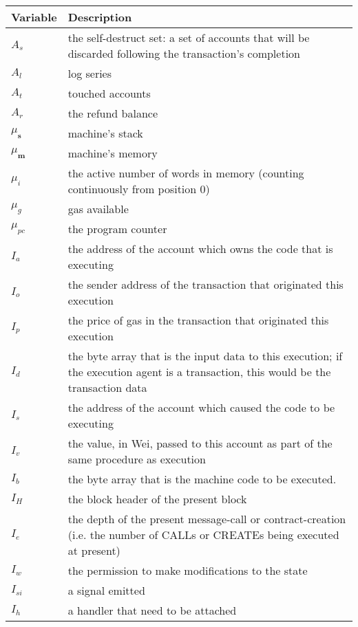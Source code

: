 \documentclass{article}
\begin{document}
\begin{tabular}{l|p{10cm}}
\textbf{Variable} & \textbf{Description} \\
\hline
\hline
$A_s$ & the self-destruct set: a set of accounts that will be discarded following the transaction’s completion \\
$A_l$ & log series \\
$A_t$ & touched accounts \\
$A_r$ & the refund balance \\
$\mu_\mathbf{s}$ & machine’s stack \\
$\mu_\mathbf{m}$ & machine’s memory \\
$\mu_i$ & the active number of words in memory (counting continuously from position 0)\\
$\mu_g$ & gas available\\
$\mu_{pc}$ & the program counter\\
$I_a$ & the address of the account which owns the code that is executing \\
$I_o$ & the sender address of the transaction that originated this execution \\
$I_p$ & the price of gas in the transaction that originated this execution \\
$I_d$ & the byte array that is the input data to this execution; if the execution agent is a transaction, this would be the transaction data \\
$I_s$ & the address of the account which caused the code to be executing \\
$I_v$ & the value, in Wei, passed to this account as part of the same procedure as execution \\
$I_b$ & the byte array that is the machine code to be executed. \\
$I_H$ & the block header of the present block \\
$I_e$ & the depth of the present message-call or contract-creation (i.e. the number of CALLs or CREATEs being executed at present)\\
$I_w$ & the permission to make modifications to the state\\
$I_{si}$ & a signal emitted \\
$I_h$ & a handler that need to be attached \\
\end{tabular}


\newpage
\end{document}
